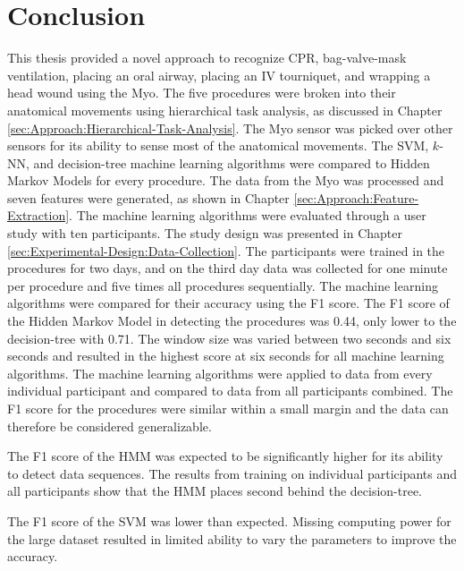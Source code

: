 
\chapter{Conclusion}
\label{ch:Conclusion}

This thesis provided a novel approach to recognize CPR, bag-valve-mask ventilation, placing an oral airway, placing an IV tourniquet, and wrapping a head wound using the Myo. The five procedures were broken into their anatomical movements using hierarchical task analysis, as discussed in Chapter \ref{sec:Approach:Hierarchical-Task-Analysis}. The Myo sensor was picked over other sensors for its ability to sense most of the anatomical movements. The SVM, $k$-NN, and decision-tree machine learning algorithms were compared to Hidden Markov Models for every procedure. The data from the Myo was processed and seven features were generated, as shown in Chapter \ref{sec:Approach:Feature-Extraction}. The machine learning algorithms were evaluated through a user study with ten participants. The study design was presented in Chapter \ref{sec:Experimental-Design:Data-Collection}. The participants were trained in the procedures for two days, and on the third day data was collected for one minute per procedure and five times all procedures sequentially. The machine learning algorithms were compared for their accuracy using the F1 score. The F1 score of the Hidden Markov Model in detecting the procedures was 0.44, only lower to the decision-tree with 0.71. The window size was varied between two seconds and six seconds and resulted in the highest score at six seconds for all machine learning algorithms. The machine learning algorithms were applied to data from every individual participant and compared to data from all participants combined. The F1 score for the procedures were similar within a small margin and the data can therefore be considered generalizable.
\par The F1 score of the HMM was expected to be significantly higher for its ability to detect data sequences. The results from training on individual participants and all participants show that the HMM places second behind the decision-tree.
\par The F1 score of the SVM was lower than expected. Missing computing power for the large dataset resulted in limited ability to vary the parameters to improve the accuracy. 
